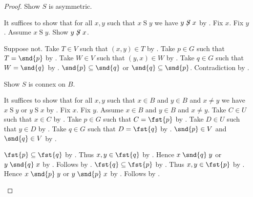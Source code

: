\begin{proof}
    Show $S$ is asymmetric.
    \begin{subproof}
        It suffices to show that for all $x,y$ such that $x\mathrel{S}y$
            we have $y\not\mathrel{S}x$ by .
        Fix $x$.
        Fix $y$.
        Assume $x\mathrel{S}y$.
        Show $y\not\mathrel{S}x$.
        \begin{subproof}
            Suppose not.
            Take $T\in V$ such that $(x,y)\in T$ by .
            Take $p\in G$ such that $T=\snd{p}$ by \auto.
            Take $W\in V$ such that $(y,x)\in W$ by .
            Take $q\in G$ such that $W=\snd{q}$ by \auto.
            $\snd{p}\subseteq\snd{q}$ or $\snd{q}\subseteq\snd{p}$.
            Contradiction by .
        \end{subproof}
    \end{subproof}

    Show $S$ is connex on $B$.
    \begin{subproof}
        It suffices to show that for all $x,y$ such that $x\in B$ and $y\in B$ and $x\neq y$
            we have $x\mathrel{S}y$ or $y\mathrel{S}x$ by .
        Fix $x$.
        Fix $y$.
        Assume $x\in B$ and $y\in B$ and $x\neq y$.
        Take $C\in U$ such that $x\in C$ by .
        Take $p\in G$ such that $C=\fst{p}$ by \auto.
        Take $D\in U$ such that $y\in D$ by .
        Take $q\in G$ such that $D=\fst{q}$ by \auto.
        $\snd{p}\in V$ and $\snd{q}\in V$ by \auto.
        \begin{byCase}
            $\fst{p}\subseteq\fst{q}$ by .
            Thus $x,y\in\fst{q}$ by .
            Hence $x\mathrel{\snd{q}}y$ or $y\mathrel{\snd{q}}x$
                by .
            Follows by .
            $\fst{q}\subseteq\fst{p}$ by .
            Thus $x,y\in\fst{p}$ by .
            Hence $x\mathrel{\snd{p}}y$ or $y\mathrel{\snd{p}}x$
                by .
            Follows by .
        \end{byCase}
    \end{subproof}


\end{proof}
